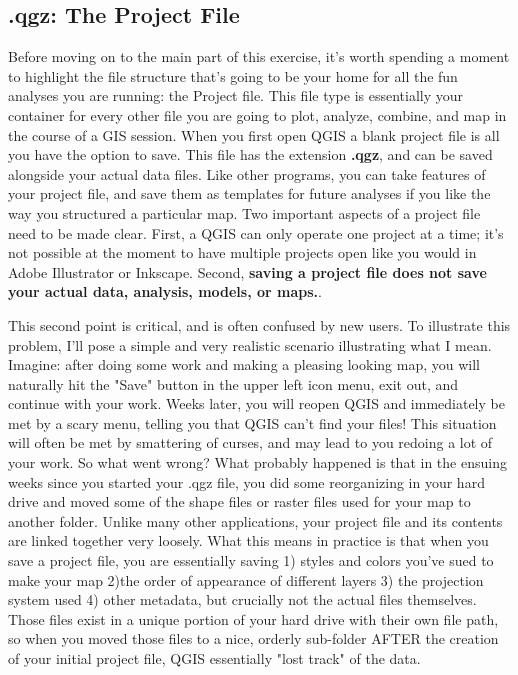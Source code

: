 \documentclass{article}
\begin{document}
\subsection{.qgz: The Project File}

Before moving on to the main part of this exercise, it's worth spending a moment to highlight the file structure that's going to be your home for all the fun analyses you are running: the Project file. This file type is essentially your container for every other file you are going to plot, analyze, combine, and map in the course of a GIS session. When you first open QGIS a blank project file is all you have the option to save. This file has the extension \textbf{.qgz}, and can be saved alongside your actual data files. Like other programs, you can take features of your project file, and save them as templates for future analyses if you like the way you structured a particular map. Two important aspects of a project file need to be made clear. First, a QGIS can only operate one project at a time; it's not possible at the moment to have multiple projects open like you would in Adobe Illustrator or Inkscape. Second, \textbf{saving a project file does not save your actual data, analysis, models, or maps.}. 

This second point is critical, and is often confused by new users. To illustrate this problem, I'll pose a simple and very realistic scenario illustrating what I mean. Imagine: after doing some work and making a pleasing looking map, you will naturally hit the "Save" button in the upper left icon menu, exit out, and continue with your work. Weeks later, you will reopen QGIS and immediately be met by a scary menu, telling you that QGIS can't find your files! This situation will often be met by smattering of curses, and may lead to you redoing a lot of your work. So what went wrong? What probably happened is that in the ensuing weeks since you started your .qgz file, you did some reorganizing in your hard drive and moved some of the shape files or raster files used for your map to another folder. Unlike many other applications, your project file and its contents are linked together very loosely. What this means in practice is that when you save a project file, you are essentially saving 1) styles and colors you've sued to make your map 2)the order of appearance of different layers 3) the projection system used 4) other metadata, but crucially not the actual files themselves. Those files exist in a unique portion of your hard drive with their own file path, so when you moved those files to a nice, orderly sub-folder AFTER the creation of your initial project file, QGIS essentially "lost track" of the data. 
\end{document}
